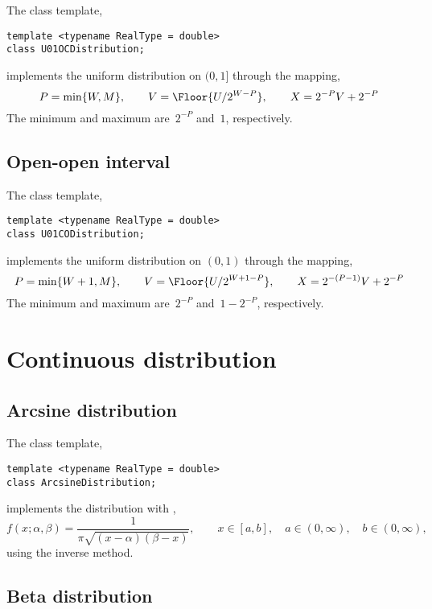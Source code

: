 The class template,
\begin{verbatim}
template <typename RealType = double>
class U01OCDistribution;
\end{verbatim}
implements the uniform distribution on $(0, 1]$ through the mapping,
\begin{equation*}
  P = \min\{W, M\},\qquad
  V = \Floor{U / 2^{W - P}},\qquad
  X = 2^{-P} V + 2^{-P}
\end{equation*}
The minimum and maximum are~$2^{-P}$ and~$1$, respectively.

\subsection{Open-open interval}
\label{sub:Open-open interval}

The class template,
\begin{verbatim}
template <typename RealType = double>
class U01CODistribution;
\end{verbatim}
implements the uniform distribution on $(0, 1)$ through the mapping,
\begin{equation*}
  P = \min\{W + 1, M\},\qquad
  V = \Floor{U / 2^{W + 1 - P}},\qquad
  X = 2^{-(P - 1)} V + 2^{-P}
\end{equation*}
The minimum and maximum are~$2^{-P}$ and~$1 - 2^{-P}$, respectively.

\section{Continuous distribution}
\label{sec:Continuous distribution}

\subsection{Arcsine distribution}
\label{sub:Arcsine distribution}

The class template,
\begin{verbatim}
template <typename RealType = double>
class ArcsineDistribution;
\end{verbatim}
implements the distribution with \pdf,
\begin{equation*}
  f(x;\alpha,\beta) = \frac{1}{\pi\sqrt{(x - \alpha)(\beta - x)}},\qquad
  x \in [a, b],\quad a \in (0,\infty),\quad b \in (0,\infty),
\end{equation*}
using the inverse method.

\subsection{Beta distribution}
\label{sub:Beta distribution}

